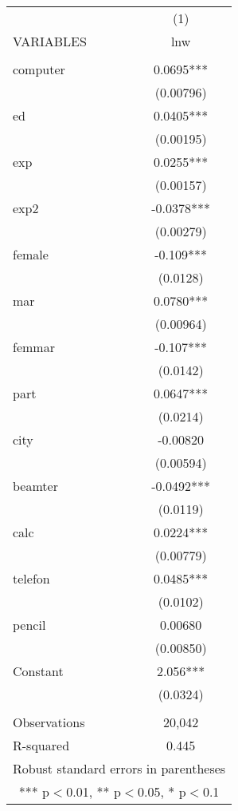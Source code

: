 \begin{tabular}{lc} \hline
 & (1) \\
VARIABLES & lnw \\ \hline
 &  \\
computer & 0.0695*** \\
 & (0.00796) \\
ed & 0.0405*** \\
 & (0.00195) \\
exp & 0.0255*** \\
 & (0.00157) \\
exp2 & -0.0378*** \\
 & (0.00279) \\
female & -0.109*** \\
 & (0.0128) \\
mar & 0.0780*** \\
 & (0.00964) \\
femmar & -0.107*** \\
 & (0.0142) \\
part & 0.0647*** \\
 & (0.0214) \\
city & -0.00820 \\
 & (0.00594) \\
beamter & -0.0492*** \\
 & (0.0119) \\
calc & 0.0224*** \\
 & (0.00779) \\
telefon & 0.0485*** \\
 & (0.0102) \\
pencil & 0.00680 \\
 & (0.00850) \\
Constant & 2.056*** \\
 & (0.0324) \\
 &  \\
Observations & 20,042 \\
 R-squared & 0.445 \\ \hline
\multicolumn{2}{c}{ Robust standard errors in parentheses} \\
\multicolumn{2}{c}{ *** p$<$0.01, ** p$<$0.05, * p$<$0.1} \\
\end{tabular}
